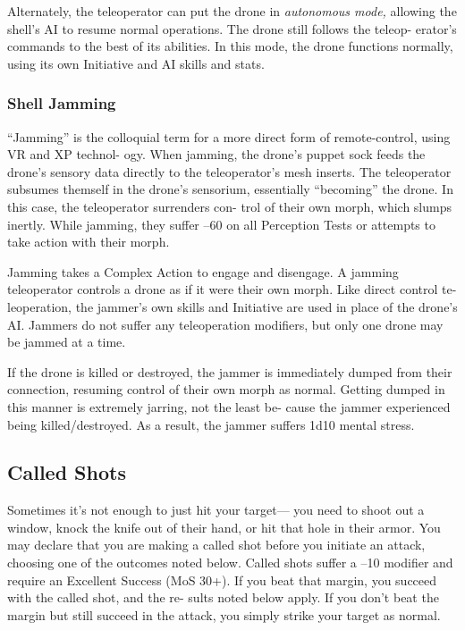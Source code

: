 Alternately, the teleoperator can put the drone in 
\textit{autonomous mode,} allowing the shell's AI to resume 
normal operations. The drone still follows the teleop-
erator's commands to the best of its abilities. In this 
mode, the drone functions normally, using its own 
Initiative and AI skills and stats.

\subsubsection{Shell Jamming}

``Jamming'' is the colloquial term for a more direct 
form of remote-control, using VR and XP technol-
ogy. When jamming, the drone's puppet sock feeds 
the drone's sensory data directly to the teleoperator's 
mesh inserts. The teleoperator subsumes themself in 
the drone's sensorium, essentially ``becoming'' the 
drone. In this case, the teleoperator surrenders con-
trol of their own morph, which slumps inertly. While 
jamming, they suffer –60 on all Perception Tests or 
attempts to take action with their morph.

Jamming takes a Complex Action to engage and 
disengage. A jamming teleoperator controls a drone 
as if it were their own morph. Like direct control te-
leoperation, the jammer's own skills and Initiative are 
used in place of the drone's AI. Jammers do not suffer 
any teleoperation modifiers, but only one drone may 
be jammed at a time.

If the drone is killed or destroyed, the jammer is 
immediately dumped from their connection, resuming 
control of their own morph as normal. Getting dumped 
in this manner is extremely jarring, not the least be-
cause the jammer experienced being killed/destroyed. 
As a result, the jammer suffers 1d10 mental stress.

\subsection{Called Shots}


Sometimes it's not enough to just hit your target—
you need to shoot out a window, knock the knife out 
of their hand, or hit that hole in their armor. You may 
declare that you are making a called shot before you 
initiate an attack, choosing one of the outcomes noted 
below. Called shots suffer a –10 modifier and require 
an Excellent Success (MoS 30+). If you beat that 
margin, you succeed with the called shot, and the re-
sults noted below apply. If you don't beat the margin 
but still succeed in the attack, you simply strike your 
target as normal.

